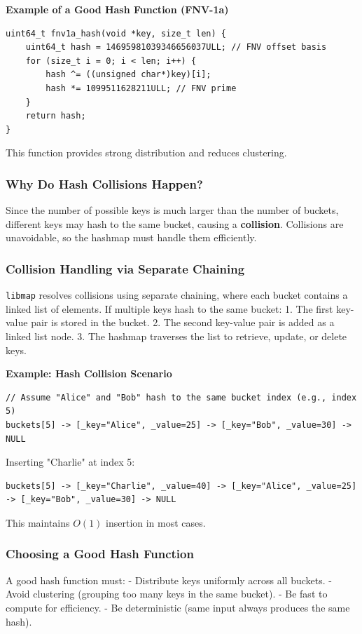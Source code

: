 \documentclass[titlepage]{article}
\begin{document}
\textbf{Example of a Good Hash Function (FNV-1a)}
\begin{verbatim}
uint64_t fnv1a_hash(void *key, size_t len) {
    uint64_t hash = 14695981039346656037ULL; // FNV offset basis
    for (size_t i = 0; i < len; i++) {
        hash ^= ((unsigned char*)key)[i];
        hash *= 1099511628211ULL; // FNV prime
    }
    return hash;
}
\end{verbatim}
This function provides strong distribution and reduces clustering.



\subsubsection{Why Do Hash Collisions Happen?}
Since the number of possible keys is much larger than the number of buckets, different keys may hash to the same bucket, causing a \textbf{collision}.
Collisions are unavoidable, so the hashmap must handle them efficiently.

\subsubsection{Collision Handling via Separate Chaining}
\texttt{libmap} resolves collisions using separate chaining, where each bucket contains a linked list of elements.
If multiple keys hash to the same bucket:
1. The first key-value pair is stored in the bucket.
2. The second key-value pair is added as a linked list node.
3. The hashmap traverses the list to retrieve, update, or delete keys.

\textbf{Example: Hash Collision Scenario}
\begin{verbatim}
// Assume "Alice" and "Bob" hash to the same bucket index (e.g., index 5)
buckets[5] -> [_key="Alice", _value=25] -> [_key="Bob", _value=30] -> NULL
\end{verbatim}
Inserting "Charlie" at index 5:
\begin{verbatim}
buckets[5] -> [_key="Charlie", _value=40] -> [_key="Alice", _value=25] -> [_key="Bob", _value=30] -> NULL
\end{verbatim}
This maintains $O(1)$ insertion in most cases.

\subsubsection{Choosing a Good Hash Function}
A good hash function must:
- Distribute keys uniformly across all buckets.
- Avoid clustering (grouping too many keys in the same bucket).
- Be fast to compute for efficiency.
- Be deterministic (same input always produces the same hash).
\end{document}
